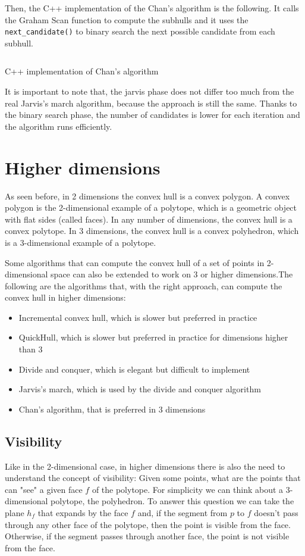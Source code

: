 \documentclass{article}
\begin{document}
Then, the C++ implementation of the Chan's algorithm is the following. It calls the Graham Scan function to compute the subhulls and it uses the \texttt{next_candidate()} to binary search the next possible candidate from each subhull.

\begin{listing}[H]
    \inputminted[linenos]{cpp}{code/chan.cpp}
    \caption{C++ implementation of Chan's algorithm}
\end{listing}

It is important to note that, the jarvis phase does not differ too much from the real Jarvis's march algorithm, because the approach is still the same. Thanks to the binary search phase, the number of candidates is lower for each iteration and the algorithm runs efficiently.

\newpage
\section{Higher dimensions}

As seen before, in 2 dimensions the convex hull is a convex polygon. A convex polygon is the 2-dimensional example of a polytope, which is a geometric object with flat sides (called faces). In any number of dimensions, the convex hull is a convex polytope. In 3 dimensions, the convex hull is a convex polyhedron, which is a 3-dimensional example of a polytope.

Some algorithms that can compute the convex hull of a set of points in 2-dimensional space can also be extended to work on 3 or higher dimensions.The following are the algorithms that, with the right approach, can compute the convex hull in higher dimensions:

\begin{itemize}
  \item Incremental convex hull, which is slower but preferred in practice
  \item QuickHull, which is slower but preferred in practice for dimensions higher than 3
  \item Divide and conquer, which is elegant but difficult to implement
  \item Jarvis's march, which is used by the divide and conquer algorithm
  \item Chan's algorithm, that is preferred in 3 dimensions
\end{itemize}

\subsection{Visibility}
Like in the 2-dimensional case, in higher dimensions there is also the need to understand the concept of visibility: Given some points, what are the points that can "see" a given face $f$ of the polytope. For simplicity we can think about a 3-dimensional polytope, the polyhedron. To answer this question we can take the plane $h_f$ that expands by the face $f$ and, if the segment from $p$ to $f$ doesn't pass through any other face of the polytope, then the point is visible from the face. Otherwise, if the segment passes through another face, the point is not visible from the face.
\end{document}
